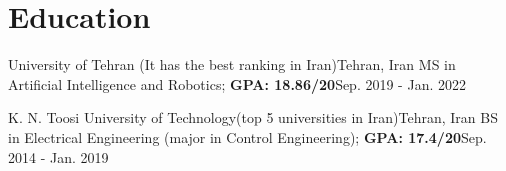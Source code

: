 
\section{Education}
  \vspace{3pt}
  \resumeSubHeadingListStart
    
    
      \resumeSubheading
      {University of Tehran (It has the best ranking in Iran)}{Tehran, Iran}
      {MS in Artificial Intelligence and Robotics; \textbf{GPA: 18.86/20}}{Sep. 2019 - Jan. 2022}
      \resumeItemListStart
      \resumeItemListEnd

      \resumeSubheading
      {K. N. Toosi University of Technology(top 5 universities in Iran)}{Tehran, Iran}
      {BS in Electrical Engineering (major in Control Engineering); \textbf{GPA: 17.4/20}}{Sep. 2014 - Jan. 2019}
      \resumeItemListStart
      \resumeItemListEnd
    
  \resumeSubHeadingListEnd